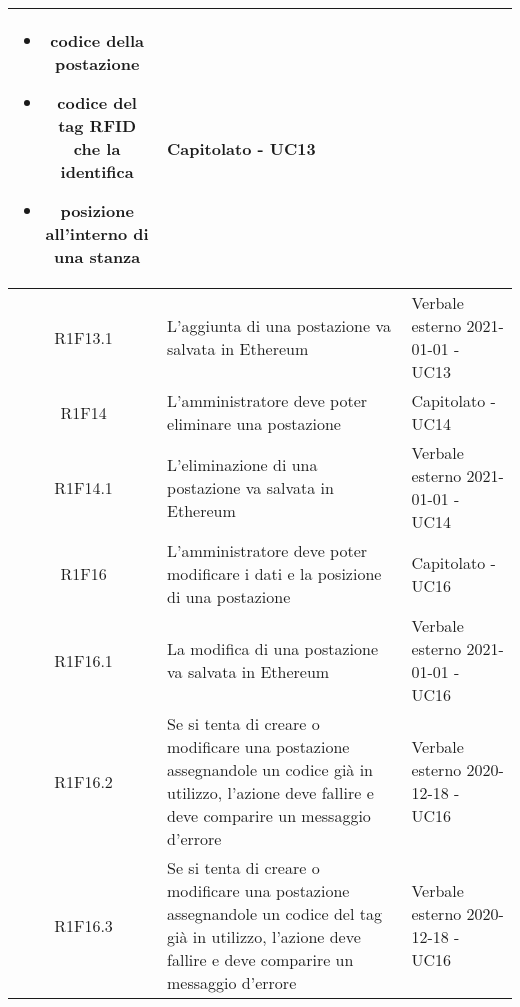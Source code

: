 \begin{center}
\begin{longtable}{|c|p{10cm}|p{4cm}|}
\begin{itemize}
			\item codice della postazione
			\item codice del tag RFID che la identifica
			\item posizione all'interno di una stanza
		\end{itemize} & Capitolato - UC13	\\
		\hline
		R1F13.1&L'aggiunta di una postazione va salvata in Ethereum	&Verbale esterno 2021-01-01 - UC13 	\\
		\hline
		R1F14&L'amministratore deve poter eliminare una postazione	& Capitolato - UC14	\\
		\hline
		R1F14.1	&L'eliminazione di una postazione va salvata in Ethereum	& Verbale esterno 2021-01-01 - UC14	\\
		\hline
		R1F16&L'amministratore deve poter modificare i dati e la posizione di una postazione	& Capitolato - UC16	\\
		\hline
		R1F16.1&	La modifica di una postazione va salvata in Ethereum& Verbale esterno 2021-01-01 - UC16	\\
		\hline
		R1F16.2&	Se si tenta di creare o modificare una postazione assegnandole un codice già in utilizzo, l'azione deve fallire e deve comparire un messaggio d'errore& Verbale esterno 2020-12-18 - UC16 	\\
		\hline
		R1F16.3&Se si tenta di creare o modificare una postazione assegnandole un codice del tag già in utilizzo, l'azione deve fallire e deve comparire un messaggio d'errore	&Verbale esterno 2020-12-18 - UC16 	\\
		\hline
		

\end{longtable}
\end{center}
